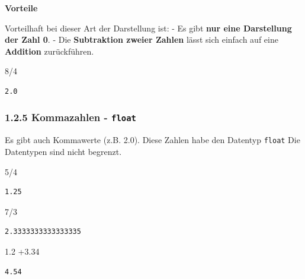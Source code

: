 \documentclass[
  11pt,
  a4paper,
  DIV=11,
  numbers=noendperiod]{scrartcl}
\newenvironment{Shaded}{\begin{snugshade}}{\end{snugshade}}
\newcommand{\DecValTok}[1]{\textcolor[rgb]{0.68,0.00,0.00}{#1}}
\newcommand{\FloatTok}[1]{\textcolor[rgb]{0.68,0.00,0.00}{#1}}
\newcommand{\OperatorTok}[1]{\textcolor[rgb]{0.37,0.37,0.37}{#1}}
\begin{document}
\textbf{Vorteile}

Vorteilhaft bei dieser Art der Darstellung ist: - Es gibt \textbf{nur
eine Darstellung der Zahl 0}. - Die \textbf{Subtraktion zweier Zahlen}
lässt sich einfach auf eine \textbf{Addition} zurückführen.

\begin{Shaded}
\begin{Highlighting}[numbers=left,,]
\DecValTok{8}\OperatorTok{/}\DecValTok{4}
\end{Highlighting}
\end{Shaded}

\begin{verbatim}
2.0
\end{verbatim}

\subsubsection{\texorpdfstring{1.2.5 Kommazahlen -
\texttt{float}}{1.2.5 Kommazahlen - float}}\label{kommazahlen---float}

Es gibt auch Kommawerte (z.B. 2.0). Diese Zahlen habe den Datentyp
\texttt{float} Die Datentypen sind nicht begrenzt.

\begin{Shaded}
\begin{Highlighting}[numbers=left,,]
\DecValTok{5}\OperatorTok{/}\DecValTok{4}
\end{Highlighting}
\end{Shaded}

\begin{verbatim}
1.25
\end{verbatim}

\begin{Shaded}
\begin{Highlighting}[numbers=left,,]
\DecValTok{7}\OperatorTok{/}\DecValTok{3}
\end{Highlighting}
\end{Shaded}

\begin{verbatim}
2.3333333333333335
\end{verbatim}

\begin{Shaded}
\begin{Highlighting}[numbers=left,,]
\FloatTok{1.2} \OperatorTok{+}\FloatTok{3.34}
\end{Highlighting}
\end{Shaded}

\begin{verbatim}
4.54
\end{verbatim}
\end{document}
